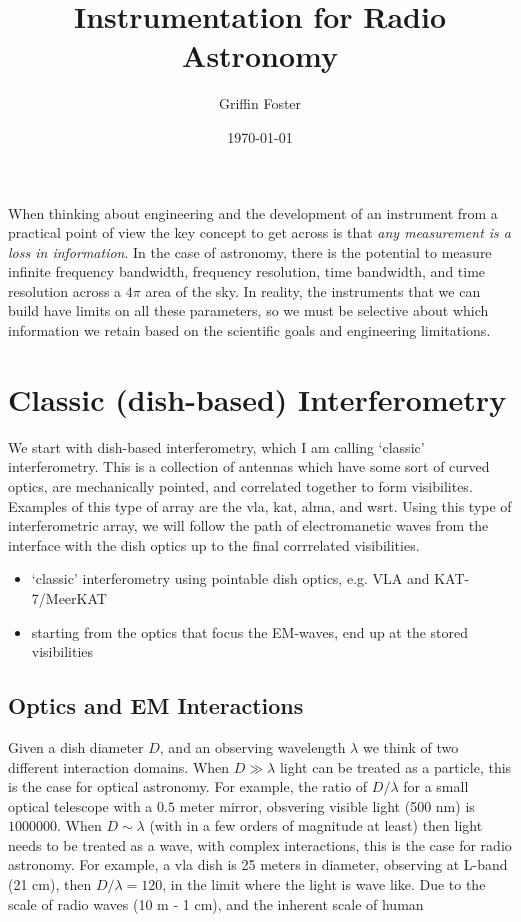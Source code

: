 \documentclass[usenatbib,usegraphicx]{article}
\begin{document}
\title{Instrumentation for Radio Astronomy}
\author{Griffin Foster}
\date{\today}
\maketitle

\label{firstpage}

When thinking about engineering and the development of an instrument from a practical point of view the key concept to get across is that \emph{any measurement is a loss in information}.
In the case of astronomy, there is the potential to measure infinite frequency bandwidth, frequency resolution, time bandwidth, and time resolution across a $4\pi$ area of the sky.
In reality, the instruments that we can build have limits on all these parameters, so we must be selective about which information we retain based on the scientific goals and engineering limitations.

\section{Classic (dish-based) Interferometry}

We start with dish-based interferometry, which I am calling `classic' interferometry.
This is a collection of antennas which have some sort of curved optics, are mechanically pointed, and correlated together to form visibilites.
Examples of this type of array are the \gls{vla}, \gls{kat}, \gls{alma}, and \gls{wsrt}.
Using this type of interferometric array, we will follow the path of electromanetic waves from the interface with the dish optics up to the final corrrelated visibilities.


\begin{itemize}
\item `classic' interferometry using pointable dish optics, e.g. VLA and KAT-7/MeerKAT
\item starting from the optics that focus the EM-waves, end up at the stored visibilities
\end{itemize}

\subsection{Optics and EM Interactions}

Given a dish diameter $D$, and an observing wavelength $\lambda$ we think of two different interaction domains.
When $D \gg \lambda$ light can be treated as a particle, this is the case for optical astronomy.
For example, the ratio of $D/\lambda$ for a small optical telescope with a $0.5$ meter mirror, obsvering visible light (500 nm) is $1000000$.
When $D \sim \lambda$ (with in a few orders of magnitude at least) then light needs to be treated as a wave, with complex interactions, this is the case for radio astronomy.
For example, a \gls{vla} dish is 25 meters in diameter, observing at L-band (21 cm), then $D/\lambda = 120$, in the limit where the light is wave like.
Due to the scale of radio waves (10 m - 1 cm), and the inherent scale of human 
\end{document}
